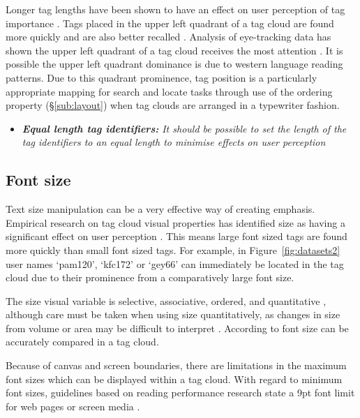 Longer tag lengths have been shown to have an effect on user perception of tag importance \citep{bateman08}. Tags placed in the upper left quadrant of a tag cloud are found more quickly \citep{bateman08} and are also better recalled \citep{rivadeneira07}. Analysis of eye-tracking data has shown the upper left quadrant of a tag cloud receives the most attention \citep[][]{lohmann09, schrammel09b}. It is possible the upper left quadrant dominance is due to western language reading patterns. Due to this quadrant prominence, tag position is a particularly appropriate mapping for search and locate tasks through use of the ordering property (\S\ref{sub:layout}) when tag clouds are arranged in a typewriter fashion. 

\begin{itemize}
	\item \emph{\textbf{Equal length tag identifiers:} It should be possible to set the length of the tag identifiers to an equal length to minimise effects on user perception}
\end{itemize}

\subsection{Font size} \label{sect:fontsize}

Text size manipulation can be a very effective way of creating emphasis. Empirical research on tag cloud visual properties has identified size as having a significant effect on user perception \citep[for example][]{lohmann09, bateman08, halvey07}. This means large font sized tags are found more quickly than small font sized tags. For example, in Figure~\vref{fig:datasets2} user names `pam120', `kfc172' or `gey66' can immediately be located in the tag cloud due to their prominence from a comparatively large font size.

The size visual variable is selective, associative, ordered, and quantitative \citep{bertin83}, although care must be taken when using size quantitatively, as changes in size from volume or area may be difficult to interpret \citep{carpendale03}. According to \citep{bateman08, schrammel09b} font size can be accurately compared in a tag cloud.

Because of canvas and screen boundaries, there are limitations in the maximum font sizes which can be displayed within a tag cloud. With regard to minimum font sizes, guidelines based on reading performance research state a 9pt font limit for web pages or screen media \citep[pg 107, chap 11:8][]{usability06}.
 
